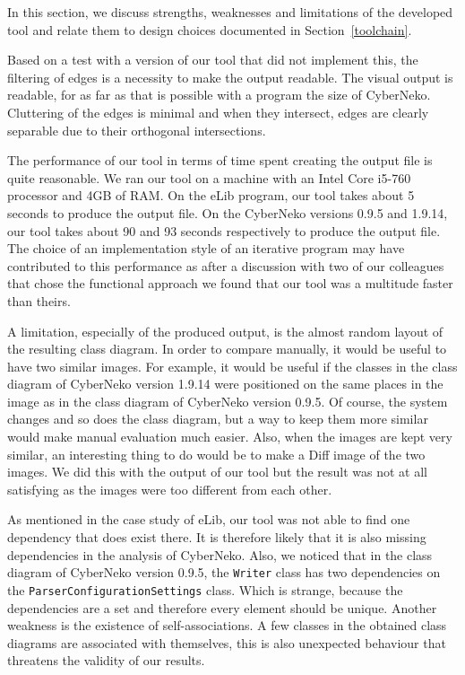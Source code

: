 In this section, we discuss strengths, weaknesses and limitations of the developed tool and relate them to design choices documented in Section~\ref{toolchain}. 

Based on a test with a version of our tool that did not implement this, the filtering of edges is a necessity to make the output readable.
The visual output is readable, for as far as that is possible with a program the size of CyberNeko.
Cluttering of the edges is minimal and when they intersect, edges are clearly separable due to their orthogonal intersections.

The performance of our tool in terms of time spent creating the output file is quite reasonable.
We ran our tool on a machine with an Intel Core i5-760 processor and 4GB of RAM.
On the eLib program, our tool takes about 5 seconds to produce the output file.
On the CyberNeko versions 0.9.5 and 1.9.14, our tool takes about 90 and 93 seconds respectively to produce the output file.
The choice of an implementation style of an iterative program may have contributed to this performance as after a discussion with two of our colleagues that chose the functional approach we found that our tool was a multitude faster than theirs.

A limitation, especially of the produced output, is the almost random layout of the resulting class diagram.
In order to compare manually, it would be useful to have two similar images.
For example, it would be useful if the classes in the class diagram of CyberNeko version 1.9.14 were positioned on the same places in the image as in the class diagram of CyberNeko version 0.9.5. 
Of course, the system changes and so does the class diagram, but a way to keep them more similar would make manual evaluation much easier. 
Also, when the images are kept very similar, an interesting thing to do would be to make a Diff image of the two images.
We did this with the output of our tool but the result was not at all satisfying as the images were too different from each other.

As mentioned in the case study of eLib, our tool was not able to find one dependency that does exist there.
It is therefore likely that it is also missing dependencies in the analysis of CyberNeko.
Also, we noticed that in the class diagram of CyberNeko version 0.9.5, the \texttt{Writer} class has two dependencies on the \texttt{ParserConfigurationSettings} class.
Which is strange, because the dependencies are a set and therefore every element should be unique. 
Another weakness is the existence of self-associations. A few classes in the obtained class diagrams are associated with themselves, this is also unexpected behaviour that threatens the validity of our results.